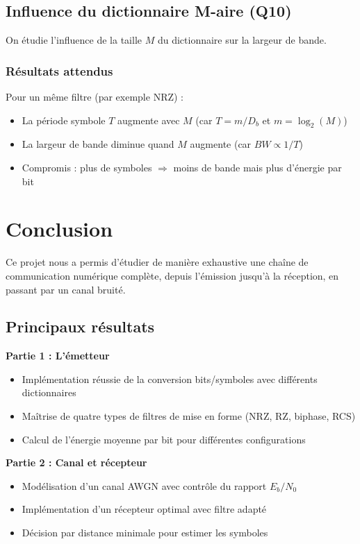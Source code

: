 \documentclass[12pt,a4paper]{article}
\begin{document}
\subsection{Influence du dictionnaire M-aire (Q10)}

On étudie l'influence de la taille $M$ du dictionnaire sur la largeur de bande.

\subsubsection{Résultats attendus}

Pour un même filtre (par exemple NRZ) :
\begin{itemize}
    \item La période symbole $T$ augmente avec $M$ (car $T = m/D_b$ et $m = \log_2(M)$)
    \item La largeur de bande diminue quand $M$ augmente (car $BW \propto 1/T$)
    \item Compromis : plus de symboles $\Rightarrow$ moins de bande mais plus d'énergie par bit
\end{itemize}

\newpage

\section*{Conclusion}

Ce projet nous a permis d'étudier de manière exhaustive une chaîne de communication numérique complète, depuis l'émission jusqu'à la réception, en passant par un canal bruité.

\subsection*{Principaux résultats}

\textbf{Partie 1 : L'émetteur}
\begin{itemize}
    \item Implémentation réussie de la conversion bits/symboles avec différents dictionnaires
    \item Maîtrise de quatre types de filtres de mise en forme (NRZ, RZ, biphase, RCS)
    \item Calcul de l'énergie moyenne par bit pour différentes configurations
\end{itemize}

\textbf{Partie 2 : Canal et récepteur}
\begin{itemize}
    \item Modélisation d'un canal AWGN avec contrôle du rapport $E_b/N_0$
    \item Implémentation d'un récepteur optimal avec filtre adapté
    \item Décision par distance minimale pour estimer les symboles
\end{itemize}
\end{document}
